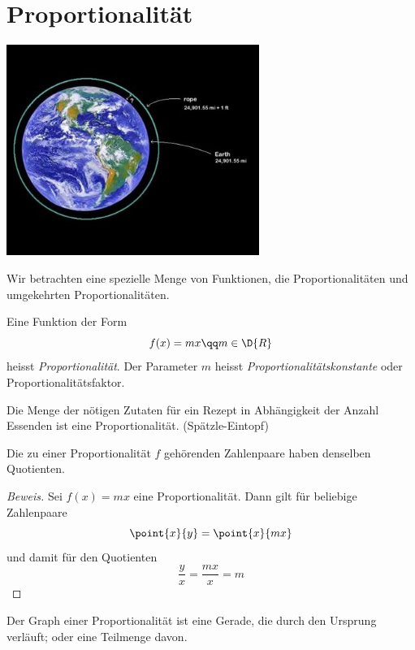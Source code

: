 \documentclass[%
11pt,%
twoside,%
titlepage,%
german,%
headsepline%
]{scrartcl}
\begin{document}
\section{Proportionalit\"at}
  \begin{center}
    \includegraphics[width=0.618\textwidth]{pictures/rope}
  \end{center}
Wir betrachten eine spezielle Menge von Funktionen, die Proportionalit\"aten und \glqq umgekehrten\grqq{} Proportionalit\"aten.
\begin{cdef}[Proportionalität]{}
Eine Funktion der Form
$$f(x)=mx\qq m\in\D{R}$$
heisst \emph{Proportionalit\"at}. Der Parameter $m$ heisst \emph{Proportionalit\"atskonstante} oder Proportionalit\"atsfaktor.
\end{cdef}
\begin{bsp}
Die Menge der n\"otigen Zutaten f\"ur ein Rezept in Abh\"angigkeit der Anzahl Essenden ist eine Proportionalit\"at. (Sp\"atzle-Eintopf)
\end{bsp}
\begin{csatz}{}
Die zu einer Proportionalit\"at $f$ geh\"orenden Zahlenpaare haben denselben Quo\-tien\-ten.
\end{csatz}
\begin{proof}[Beweis]
Sei $f(x)=mx$ eine Proportionalit\"at. Dann gilt f\"ur beliebige Zahlenpaare
$$\point{x}{y}=\point{x}{mx}$$
und damit f\"ur den Quotienten
$$\frac{y}{x}=\frac{mx}{x}=m$$
\end{proof}
\begin{csatz}{}
Der Graph einer Proportionalit\"at ist eine Gerade, die durch den Ursprung verl\"auft; oder eine Teilmenge davon.
\end{csatz}
\end{document}
